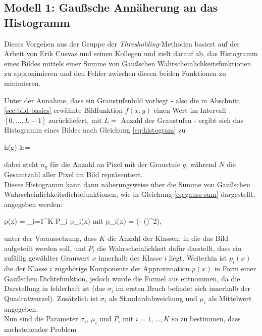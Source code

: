 	\subsection{Modell 1: Gaußsche Annäherung an das Histogramm}
	\label{sec:meth1}
		
		Dieses Vorgehen aus der Gruppe der \textit{Thresholding}-Methoden basiert auf der Arbeit von Erik Cuevas und seinen Kollegen \cite{cuevas-meth1} und zielt darauf ab, das Histogramm eines Bildes mittels einer Summe von Gaußschen Wahrscheinlichkeitsfunktionen zu approximieren und den Fehler zwischen diesen beiden Funktionen zu minimieren.
		
		Unter der Annahme, dass ein Graustufenbild vorliegt - also die in Abschnitt \ref{sec:bild-basics} erwähnte Bildfunktion $f(x,y)$ einen Wert im Intervall $[0, ..., L-1]$ zurückliefert, mit $L = $ Anzahl der Graustufen - ergibt sich das Histogramm eines Bildes nach Gleichung \ref{eq:histogram} zu
		\begin{flalign}
			\centering
			h(g) &=  \label{eq:histogram}
		\end{flalign}
		dabei steht $n_{g}$ für die Anzahl an Pixel mit der Graustufe $g$, während $N$ die Gesamtzahl aller Pixel im Bild repräsentiert.\\
		Dieses Histogramm kann dann näherungsweise über die Summe von Gaußschen Wahrscheinlichkeitsdichtefunktionen, wie in Gleichung \ref{eq:gauss-sum} dargestellt, angegeben werden:
		\begin{flalign}
			\centering
			p(x) = \sum_{i=1}^{K} P_{i} \cdot p_{i}(x) \quad \textrm{mit} \quad p_{i}(x) =  \exp\left(- \cdot \left(\right)^{2}\right), \label{eq:gauss-sum}
		\end{flalign}
		unter der Voraussetzung, dass $K$ die Anzahl der Klassen, in die das Bild aufgeteilt werden soll, und $P_{i}$ die Wahrscheinlichkeit dafür darstellt, dass ein zufällig gewählter Grauwert $x$ innerhalb der Klasse $i$ liegt. Weiterhin ist $p_{i}(x)$ die der Klasse $i$ zugehörige Komponente der Approximation $p(x)$ in Form einer Gaußschen Dichtefunktion, jedoch wurde die Formel aus \cite{papula-gauss} entnommen, da die Darstellung in \cite{cuevas-meth1} fehlerhaft ist (das $\sigma_{i}$ im ersten Bruch befindet sich innerhalb der Quadratwurzel). Zusätzlich ist $\sigma_{i}$ als Standardabweichung und $\mu_{i}$ als Mittelwert angegeben.\\
		Nun sind die Parameter $\sigma_{i}$, $\mu_{i}$ und $P_{i}$ mit $i = 1, ..., K$ so zu bestimmen, dass nachstehendes Problem
